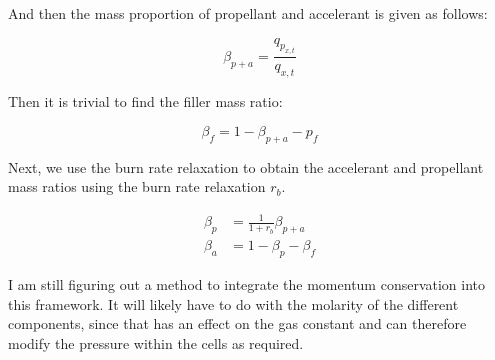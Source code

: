 And then the mass proportion of propellant and accelerant is given as follows:

\begin{equation}
    \beta_{p+a} = \frac{q_{p_{x,t}}}{q_{x,t}}
\end{equation}

Then it is trivial to find the filler mass ratio:

\begin{equation}
    \beta_f = 1-\beta_{p+a}-p_f
\end{equation}

Next, we use the burn rate relaxation to obtain the accelerant and propellant
mass ratios using the burn rate relaxation $r_b$.

\begin{align}
    \beta_p &= \frac{1}{1+r_b} \beta_{p+a} \\
    \beta_a &= 1-\beta_p-\beta_f
\end{align}

I am still figuring out a method to integrate the momentum conservation
into this framework. It will likely have to do with the molarity of the different
components, since that has an effect on the gas constant and can
therefore modify the pressure within the cells as required.




